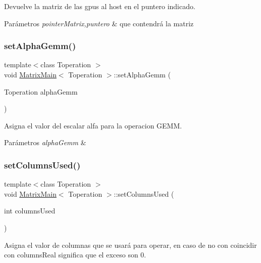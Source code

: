 Devuelve la matriz de las gpus al host en el puntero indicado. 


\begin{DoxyParams}{Parámetros}
{\em pointer\+Matrix,puntero} & que contendrá la matriz \\
\hline
\end{DoxyParams}
\mbox{\label{classMatrixMain_a6e67efda03cdd8e70215247b7f857002}} 
\subsubsection{\texorpdfstring{set\+Alpha\+Gemm()}{setAlphaGemm()}}
{\footnotesize\ttfamily template$<$class Toperation $>$ \\
void \hyperlink{classMatrixMain}{Matrix\+Main}$<$ Toperation $>$\+::set\+Alpha\+Gemm (\begin{DoxyParamCaption}\item[{Toperation}]{alpha\+Gemm }\end{DoxyParamCaption})}



Asigna el valor del escalar alfa para la operacion G\+E\+MM. 


\begin{DoxyParams}{Parámetros}
{\em alpha\+Gemm} & \\
\hline
\end{DoxyParams}
\mbox{\label{classMatrixMain_aa85480f53c9b1deea09d5fbed1a48d2e}} 
\subsubsection{\texorpdfstring{set\+Columns\+Used()}{setColumnsUsed()}}
{\footnotesize\ttfamily template$<$class Toperation $>$ \\
void \hyperlink{classMatrixMain}{Matrix\+Main}$<$ Toperation $>$\+::set\+Columns\+Used (\begin{DoxyParamCaption}\item[{int}]{columns\+Used }\end{DoxyParamCaption})}



Asigna el valor de columnas que se usará para operar, en caso de no con coincidir con columns\+Real significa que el exceso son 0. 



